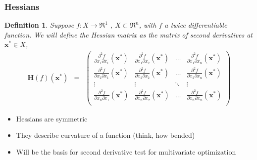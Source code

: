 \documentclass{beamer}
\newtheorem{defn}{Definition}
\numberwithin{equation}{section}
\begin{document}
\begin{frame}
\frametitle{Hessians}


\begin{defn}
Suppose $f:X \rightarrow \Re^{1}$ , $X \subset \Re^{n}$, with $f$ a twice differentiable function.  We will define the Hessian matrix as the matrix of second derivatives at $\boldsymbol{x}^{*} \in X$,
\begin{eqnarray}
\boldsymbol{H}(f)(\boldsymbol{x}^{*} )  & = & \begin{pmatrix} 
		\frac{\partial^{2} f }{\partial x_{1} \partial x_{1} } (\boldsymbol{x}^{*} ) & \frac{\partial^{2} f }{\partial x_{1} \partial x_{2} } (\boldsymbol{x}^{*} ) & \hdots & \frac{\partial^{2} f }{\partial x_{1} \partial x_{n} } (\boldsymbol{x}^{*} ) \\
		\frac{\partial^{2} f }{\partial x_{2} \partial x_{1} } (\boldsymbol{x}^{*} ) & \frac{\partial^{2} f }{\partial x_{2} \partial x_{2} } (\boldsymbol{x}^{*} ) & \hdots & \frac{\partial^{2} f }{\partial x_{2} \partial x_{n} } (\boldsymbol{x}^{*} ) \\
		\vdots & \vdots & \ddots & \vdots \\
		\frac{\partial^{2} f }{\partial x_{n} \partial x_{1} } (\boldsymbol{x}^{*} ) & \frac{\partial^{2} f }{\partial x_{n} \partial x_{2} } (\boldsymbol{x}^{*} ) & \hdots & \frac{\partial^{2} f }{\partial x_{n} \partial x_{n} } (\boldsymbol{x}^{*} ) \\
\end{pmatrix} \nonumber 
\end{eqnarray}

\end{defn}		

\begin{itemize}
\item[-] Hessians are symmetric
\item[-] They describe curvature of a function (think, how bended)
\item[-] Will be the basis for second derivative test for multivariate optimization
\end{itemize}

											

\end{frame}
\end{document}
